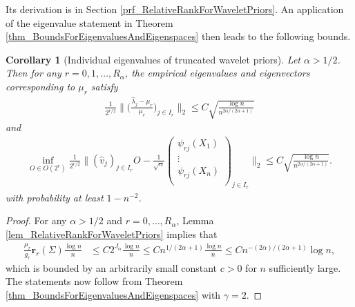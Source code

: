 \documentclass[a4paper,11pt]{article} %
\numberwithin{equation}{section}
\theoremstyle{definition}
\theoremstyle{remark}
\theoremstyle{plain}
\newtheorem{corollary}[definition]{Corollary}
\begin{document}
\noindent Its derivation is in Section \ref{prf_RelativeRankForWaveletPriors}.
An application of the eigenvalue statement in Theorem \ref{thm_BoundsForEigenvaluesAndEigenspaces} then leads to the following bounds.

\begin{corollary}[Individual eigenvalues of truncated wavelet priors]%
  \label{cor_IndividualEigenvaluesOfTruncatedWaveletPriors}
  Let \( \alpha > 1/2 \).
  Then for any \( r = 0, 1, \dots, R_{\alpha} \), the empirical eigenvalues and eigenvectors corresponding to \( \mu_{r} \) satisfy
  \begin{align}
       \frac{1}{2^{r/2}}  
       \Big\| \Big( \frac{\widehat{\lambda}_{j} - \mu_{r}}{\mu_{r}} \Big)_{j \in I_{r}} \Big\|_{2}  
    \le 
        C \sqrt{\frac{\log n}{n^{2 \alpha / (2 \alpha + 1)}}}
    \end{align}
    and
    \begin{align}
    \inf_{O \in O(2^r)} 
    \frac{1}{2^{r/2}} \bigg\| (\widehat{v}_{j})_{j \in I_{r}} O -\frac{1}{\sqrt{n}} \begin{pmatrix}
                                                                    \psi_{r j}(X_{1}) \\
                                                                    \vdots            \\
                                                                    \psi_{r j}(X_{n}) \\
                                                                  \end{pmatrix}_{j \in I_{r}}
                      \bigg\|_{2}
    \le 
    C \sqrt{\frac{\log n}{n^{2 \alpha / (2 \alpha + 1)}}}.
  \end{align}
  with probability at least \( 1 - n^{-2} \).
\end{corollary}%

\begin{proof}[Proof]%
  For any \( \alpha > 1/2 \) and \( r = 0, \dots, R_{\alpha} \), Lemma \ref{lem_RelativeRankForWaveletPriors} implies that
  \begin{align}
    \frac{\mu_{r}}{g_{r}} \mathbf{r}_{r}(\Sigma) \frac{\log n}{n}
    & \le 
    C 2^{J_{\alpha}} \frac{\log n}{n} 
    \le 
    C n^{1 / (2 \alpha + 1)} \frac{\log n}{n} 
    \le 
    C n^{-(2 \alpha) / (2 \alpha + 1)} \log n,
  \end{align}
  which is bounded by an arbitrarily small constant \( c > 0 \) for \( n \) sufficiently large.
  The statements now follow from Theorem \ref{thm_BoundsForEigenvaluesAndEigenspaces} with \( \gamma = 2 \).
\end{proof}%
\end{document}
